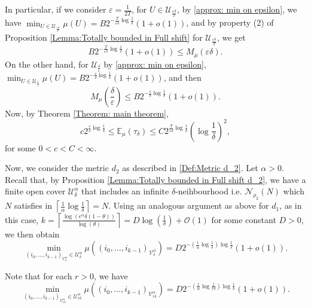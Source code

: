 \documentclass[11pt, reqno]{amsart}
\theoremstyle{plain}%
\theoremstyle{definition}
\theoremstyle{definition}
\def\U{\ensuremath{\mathcal U}}
\def\E{\mathbb E}
\numberwithin{equation}{section}
\begin{document}
In particular, if we consider $\varepsilon= \frac{1}{2T}$, for $U\in\U_{\frac{\varepsilon\delta}{T}}$, by \eqref{approx: min on epsilon}, we have $\min_{ U\in\U_{\frac{\varepsilon\delta}{T}}} \mu(U)= B2^{-\frac{T}{\varepsilon\delta}\log\frac{1}{\delta}}(1+o(1))$, and by property (2) of Proposition \ref{Lemma:Totally bounded in Full shift} for $\U_{\frac{\varepsilon\delta}{T}}$, we get $$ B2^{-\frac{T}{\varepsilon\delta}\log\frac{1}{\delta}}(1+o(1)) \le M_\mu\left(\varepsilon\delta\right) .$$
On the other hand, for $\U_{\frac{\delta}{\varepsilon}}$  by \eqref{approx: min on epsilon}, $\min_{U\in\U_{\frac{\delta}{\varepsilon}}}\mu(U)=  B2^{-\frac{\varepsilon}{\delta}\log\frac{1}{\delta}}(1+o(1))$, and then
$$ M_\mu\left(\frac{\delta}{\varepsilon}\right)\le B2^{-\frac{\varepsilon}{\delta}\log\frac{1}{\delta}}(1+o(1)).$$
Now, by Theorem \ref{Theorem: main theorem}, 
\begin{equation} \label{Result for example d_1}
    c 2^{\frac{\varepsilon}{\delta}\log\frac{1}{\delta}}\le \E_\mu(\tau_\delta)\le C 2^{\frac{T}{\varepsilon\delta}\log\frac{1}{\delta}} \left(\log\frac{1}{\delta}\right)^2,
\end{equation} 
for some $0<c<C<\infty$.


Now, we consider the metric $d_2$ as described in \eqref{Def:Metric d_2}. Let $\alpha>0$. Recall that, by Proposition \ref{Lemma:Totally bounded in Full shift d_2}, we have a finite open cover $\U_\delta^\alpha$ that includes an infinite $\delta$-neihbourhood i.e. $\mathcal{N}_{\rho_2}(N)$ which $N$ satisfies in $\left\lceil\frac{1}{\alpha}\log\frac{1}{\delta}\right\rceil= N$. Using an analogous argument as above for $d_1$, as in this case, $k=\left\lceil \frac{\log(e^\alpha\delta(1-\theta))}{\log(\theta)}\right\rceil=D\log\left(\frac{1}{\delta}\right)+\mathcal{O}(1)$ for some constant $D>0$, we then obtain
$$\min_{(i_0,\ldots,i_{k-1})_{\mathcal{V}_{\delta}^\alpha}\in \U_\delta^\alpha}\mu((i_0,\ldots,i_{k-1})_{\mathcal{V}_{\delta}^\alpha})=  D2^{-\left(\frac{1}{\alpha}\log\frac{1}{\delta}\right)\log\frac{1}{\delta}}(1+o(1)).$$

Note that for each $r>0$, we have $$ 
\min_{(i_0,\ldots,i_{k-1})_{\mathcal{V}_{r\delta}^\alpha}\in \U_{r\delta}^\alpha}\mu((i_0,\ldots,i_{k-1})_{\mathcal{V}_{r\delta}^\alpha})= D2^{-\left(\frac{1}{\alpha}\log\frac{1}{r\delta}\right)\log\frac{1}{\delta}}(1+o(1)).$$
\end{document}
